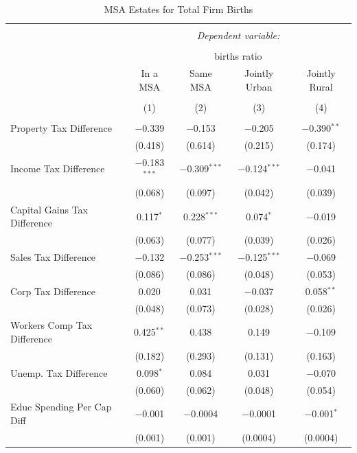 \documentclass[12pt,a4paper]{article}
\begin{document}
\begin{table}[!htbp] \centering 
  \caption{MSA Estates for  Total Firm Births} 
  \label{--metro} 
\begin{tabular}{@{\extracolsep{5pt}}lcccc} 
\\[-1.8ex]\hline 
\hline \\[-1.8ex] 
 & \multicolumn{4}{c}{\textit{Dependent variable:}} \\ 
\cline{2-5} 
\\[-1.8ex] & \multicolumn{4}{c}{births ratio} \\ 
 & In a MSA & Same MSA & Jointly Urban & Jointly Rural \\ 
\\[-1.8ex] & (1) & (2) & (3) & (4)\\ 
\hline \\[-1.8ex] 
 Property Tax Difference & $-$0.339 & $-$0.153 & $-$0.205 & $-$0.390$^{**}$ \\ 
  & (0.418) & (0.614) & (0.215) & (0.174) \\ 
  Income Tax Difference & $-$0.183$^{***}$ & $-$0.309$^{***}$ & $-$0.124$^{***}$ & $-$0.041 \\ 
  & (0.068) & (0.097) & (0.042) & (0.039) \\ 
  Capital Gains Tax Difference & 0.117$^{*}$ & 0.228$^{***}$ & 0.074$^{*}$ & $-$0.019 \\ 
  & (0.063) & (0.077) & (0.039) & (0.026) \\ 
  Sales Tax Difference & $-$0.132 & $-$0.253$^{***}$ & $-$0.125$^{***}$ & $-$0.069 \\ 
  & (0.086) & (0.086) & (0.048) & (0.053) \\ 
  Corp Tax Difference & 0.020 & 0.031 & $-$0.037 & 0.058$^{**}$ \\ 
  & (0.048) & (0.073) & (0.028) & (0.026) \\ 
  Workers Comp Tax Difference & 0.425$^{**}$ & 0.438 & 0.149 & $-$0.109 \\ 
  & (0.182) & (0.293) & (0.131) & (0.163) \\ 
  Unemp. Tax Difference & 0.098$^{*}$ & 0.084 & 0.031 & $-$0.070 \\ 
  & (0.060) & (0.062) & (0.048) & (0.054) \\ 
  Educ Spending Per Cap Diff & $-$0.001 & $-$0.0004 & $-$0.0001 & $-$0.001$^{*}$ \\ 
  & (0.001) & (0.001) & (0.0004) & (0.0004) \\ 

\end{tabular}
\end{table}
\end{document}
